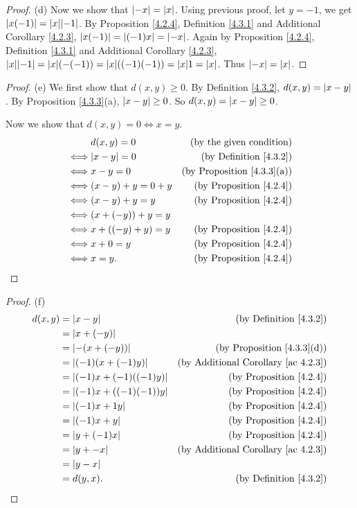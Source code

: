 \begin{proof}{(d)}
Now we show that \(\abs*{-x} = \abs*{x}\).
Using previous proof, let \(y = -1\), we get \(\abs*{x(-1)} = \abs*{x}\abs*{-1}\).
By Proposition \ref{4.2.4}, Definition \ref{4.3.1} and Additional Corollary \ref{4.2.3}, \(\abs*{x(-1)} = \abs*{(-1)x} = \abs*{-x}\).
Again by Proposition \ref{4.2.4}, Definition \ref{4.3.1} and Additional Corollary \ref{4.2.3}, \(\abs*{x}\abs*{-1} = \abs*{x}(-(-1)) = \abs*{x}((-1)(-1)) = \abs*{x}1 = \abs*{x}\).
Thus \(\abs*{-x} = \abs*{x}\).
\end{proof}

\begin{proof}{(e)}
We first show that \(d(x, y) \geq 0\).
By Definition \ref{4.3.2}, \(d(x, y) = \abs*{x - y}\).
By Proposition \ref{4.3.3}(a), \(\abs*{x - y} \geq 0\).
So \(d(x, y) = \abs*{x - y} \geq 0\).

Now we show that \(d(x, y) = 0 \iff x = y\).
\begin{align*}
& d(x, y) = 0 & \text{(by the given condition)} \\
\iff & \abs*{x - y} = 0 & \text{(by Definition \ref{4.3.2})} \\
\iff & x - y = 0 & \text{(by Proposition \ref{4.3.3}(a))} \\
\iff & (x - y) + y = 0 + y & \text{(by Proposition \ref{4.2.4})} \\
\iff & (x - y) + y = y & \text{(by Proposition \ref{4.2.4})} \\
\iff & (x + (-y)) + y = y \\
\iff & x + ((-y) + y) = y & \text{(by Proposition \ref{4.2.4})} \\
\iff & x + 0 = y & \text{(by Proposition \ref{4.2.4})} \\
\iff & x = y. & \text{(by Proposition \ref{4.2.4})}
\end{align*}
\end{proof}

\begin{proof}{(f)}
\begin{align*}
d(x, y) &= \abs*{x - y} & \text{(by Definition \ref{4.3.2})} \\
&= \abs*{x + (-y)} \\
&= \abs*{-(x + (-y))} & \text{(by Proposition \ref{4.3.3}(d))} \\
&= \abs*{(-1)(x + (-1)y)} & \text{(by Additional Corollary \ref{ac 4.2.3})} \\
&= \abs*{(-1)x + (-1)((-1)y)} & \text{(by Proposition \ref{4.2.4})} \\
&= \abs*{(-1)x + ((-1)(-1))y} & \text{(by Proposition \ref{4.2.4})} \\
&= \abs*{(-1)x + 1y} & \text{(by Proposition \ref{4.2.4})} \\
&= \abs*{(-1)x + y} & \text{(by Proposition \ref{4.2.4})} \\
&= \abs*{y + (-1)x} & \text{(by Proposition \ref{4.2.4})} \\
&= \abs*{y + -x} & \text{(by Additional Corollary \ref{ac 4.2.3})} \\
&= \abs*{y - x} \\
&= d(y, x). & \text{(by Definition \ref{4.3.2})}
\end{align*}
\end{proof}

